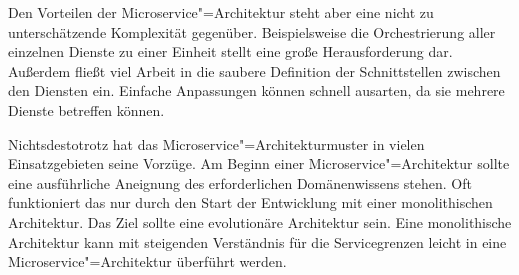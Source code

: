 Den Vorteilen der Microservice"=Architektur steht aber eine nicht zu unterschätzende Komplexität gegenüber. Beispielsweise die Orchestrierung aller einzelnen Dienste zu einer Einheit stellt eine große Herausforderung dar. Außerdem fließt viel Arbeit in die saubere Definition der Schnittstellen zwischen den Diensten ein. Einfache Anpassungen können schnell ausarten, da sie mehrere Dienste betreffen können. 

Nichtsdestotrotz hat das Microservice"=Architekturmuster in vielen Einsatzgebieten seine Vorzüge. Am Beginn einer Microservice"=Architektur sollte eine ausführliche Aneignung des erforderlichen Domänenwissens stehen. Oft funktioniert das nur durch den Start der Entwicklung mit einer monolithischen Architektur. Das Ziel sollte eine evolutionäre Architektur sein. Eine monolithische Architektur kann mit steigenden Verständnis für die Servicegrenzen leicht in eine Microservice"=Architektur überführt werden.